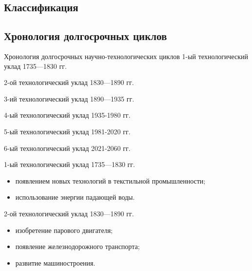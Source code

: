 \documentclass[_Venture_p1.tex]{subfiles}
\begin{document}

\subsection{Классификация}
\subsection{Хронология долгосрочных циклов}
\begin{frame}{Хронология долгосрочных научно-технологических циклов}
	1-ый технологический уклад 1735—1830 гг.
	
	2-ой технологический уклад 1830—1890 гг.
	
	3-ий технологический уклад 1890—1935 гг.
	
	4-ый технологический уклад 1935-1980 гг.
	
	5-ый технологический уклад 1981-2020 гг.
	
	6-ый технологический уклад 2021-2060 гг.
\end{frame}

\begin{frame}{1-ый технологический уклад 1735—1830 гг.}
\begin{itemize}
	\item появлением новых технологий в текстильной промышленности; 
	\item использование энергии падающей воды.
\end{itemize}
\end{frame}

\begin{frame}{2-ой технологический уклад 1830—1890 гг.}
\begin{itemize}
	\item изобретение парового двигателя; 
	\item появление железнодорожного транспорта;
	\item развитие машиностроения.
\end{itemize}
\end{frame}
\end{document}
